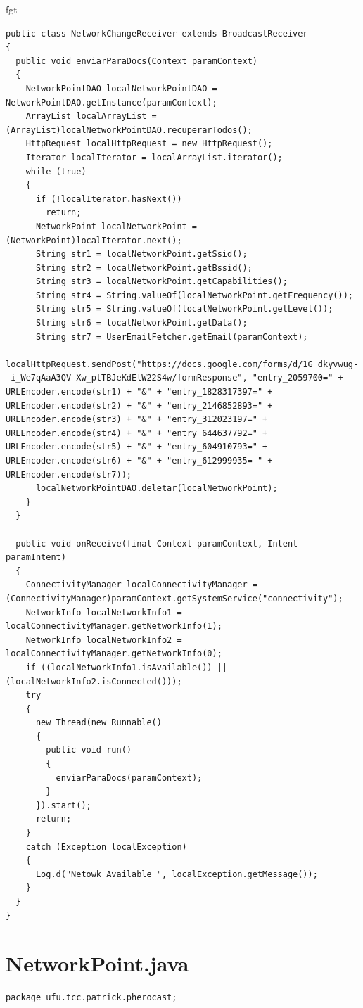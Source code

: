 fgt\documentclass[12pt, %
openright, 
oneside, %
a4paper,    %
brazil]{facom-ufu-abntex2}
\begin{document}
\begin{anexosenv}
\begin{lstlisting}
public class NetworkChangeReceiver extends BroadcastReceiver
{
  public void enviarParaDocs(Context paramContext)
  {
    NetworkPointDAO localNetworkPointDAO = NetworkPointDAO.getInstance(paramContext);
    ArrayList localArrayList = (ArrayList)localNetworkPointDAO.recuperarTodos();
    HttpRequest localHttpRequest = new HttpRequest();
    Iterator localIterator = localArrayList.iterator();
    while (true)
    {
      if (!localIterator.hasNext())
        return;
      NetworkPoint localNetworkPoint = (NetworkPoint)localIterator.next();
      String str1 = localNetworkPoint.getSsid();
      String str2 = localNetworkPoint.getBssid();
      String str3 = localNetworkPoint.getCapabilities();
      String str4 = String.valueOf(localNetworkPoint.getFrequency());
      String str5 = String.valueOf(localNetworkPoint.getLevel());
      String str6 = localNetworkPoint.getData();
      String str7 = UserEmailFetcher.getEmail(paramContext);
      localHttpRequest.sendPost("https://docs.google.com/forms/d/1G_dkyvwug--i_We7qAaA3QV-Xw_plTBJeKdElW22S4w/formResponse", "entry_2059700=" + URLEncoder.encode(str1) + "&" + "entry_1828317397=" + URLEncoder.encode(str2) + "&" + "entry_2146852893=" + URLEncoder.encode(str3) + "&" + "entry_312023197=" + URLEncoder.encode(str4) + "&" + "entry_644637792=" + URLEncoder.encode(str5) + "&" + "entry_604910793=" + URLEncoder.encode(str6) + "&" + "entry_612999935= " + URLEncoder.encode(str7));
      localNetworkPointDAO.deletar(localNetworkPoint);
    }
  }

  public void onReceive(final Context paramContext, Intent paramIntent)
  {
    ConnectivityManager localConnectivityManager = (ConnectivityManager)paramContext.getSystemService("connectivity");
    NetworkInfo localNetworkInfo1 = localConnectivityManager.getNetworkInfo(1);
    NetworkInfo localNetworkInfo2 = localConnectivityManager.getNetworkInfo(0);
    if ((localNetworkInfo1.isAvailable()) || (localNetworkInfo2.isConnected()));
    try
    {
      new Thread(new Runnable()
      {
        public void run()
        {
          enviarParaDocs(paramContext);
        }
      }).start();
      return;
    }
    catch (Exception localException)
    {
      Log.d("Netowk Available ", localException.getMessage());
    }
  }
}

\end{lstlisting}
\section{NetworkPoint.java}
\begin{lstlisting}
package ufu.tcc.patrick.pherocast;


\end{lstlisting}
\end{anexosenv}
\end{document}
